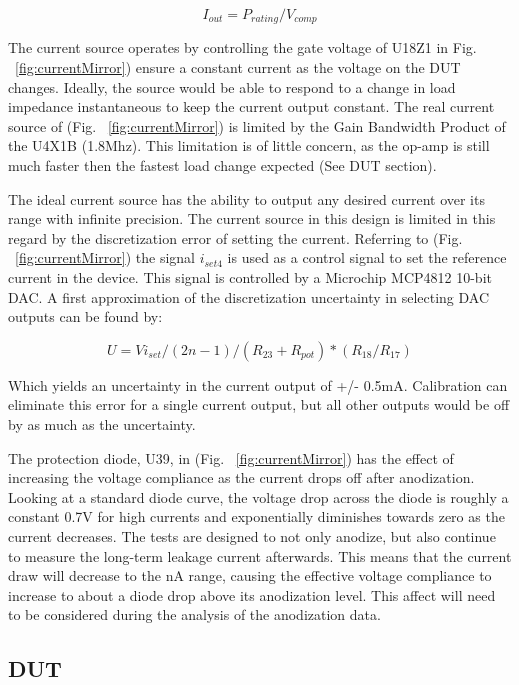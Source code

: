 \documentclass[journal]{IEEEtran}
\begin{document}
\begin{equation}
I_{out} = P_{rating} / V_{comp}
\end{equation}

The current source operates by controlling the gate voltage of U18Z1 in Fig. ~\ref{fig:currentMirror}) ensure a constant current as the voltage on the DUT changes. Ideally, the source would be able to respond to a change in load impedance instantaneous to keep the current output constant. The real current source of (Fig. ~\ref{fig:currentMirror}) is limited by the Gain Bandwidth Product of the U4X1B (1.8Mhz). This limitation is of little concern, as the op-amp is still much faster then the fastest load change expected (See DUT section).

The ideal current source has the ability to output any desired current over its range with infinite precision. The current source in this design is limited in this regard by the discretization error of setting the current. Referring to (Fig. ~\ref{fig:currentMirror}) the signal $i_{set4}$ is used as a control signal to set the reference current in the device. This signal is controlled by a Microchip MCP4812 10-bit DAC. A first approximation of the discretization uncertainty in selecting DAC outputs can be found by:


\begin{equation}
U = Vi_{set} /(2n-1) / (R_{23} + R_{pot}) *(R_{18}/R_{17})
\end{equation}


Which yields an uncertainty in the current output of +/- 0.5mA. Calibration can eliminate this error for a single current output, but all other outputs would be off by as much as the uncertainty.

The protection diode, U39, in (Fig. ~\ref{fig:currentMirror}) has the effect of increasing the voltage compliance as the current drops off after anodization. Looking at a standard diode curve, the voltage drop across the diode is roughly a constant 0.7V for high currents and exponentially diminishes towards zero as the current decreases. The tests are designed to not only anodize, but also continue to measure the long-term leakage current afterwards. This means that the current draw will decrease to the nA range, causing the effective voltage compliance to increase to about a diode drop above its anodization level. This affect will need to be considered during the analysis of the anodization data.

\subsection{DUT}
\end{document}
